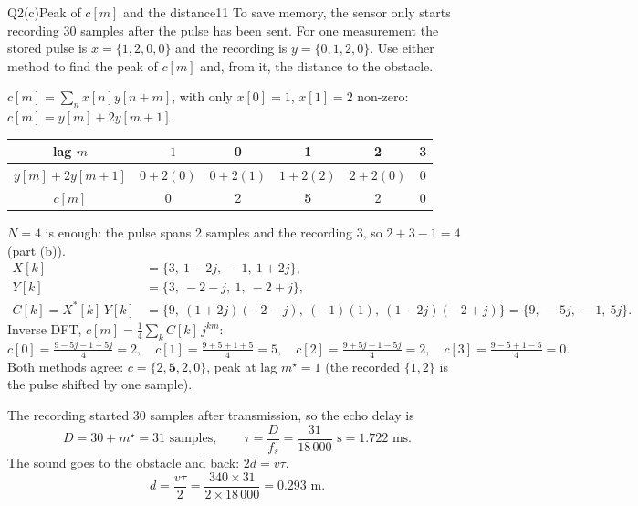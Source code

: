\begin{qcard}{Q2(c)}{Peak of $c[m]$ and the distance}{11}
To save memory, the sensor only starts recording 30 samples after the pulse has been sent. For one measurement the stored pulse is $x=\{1,2,0,0\}$ and the recording is $y=\{0,1,2,0\}$. Use either method to find the peak of $c[m]$ and, from it, the distance to the obstacle.
\end{qcard}
\begin{solution}
 $c[m]=\sum_nx[n]y[n+m]$, with only $x[0]=1$, $x[1]=2$ non-zero: $c[m]=y[m]+2y[m+1]$.
\begin{center}\small\renewcommand{\arraystretch}{1.25}\begin{tabular}{@{}c|ccccc@{}}
lag $m$&$-1$&0&1&2&3\\\hline
$y[m]+2y[m+1]$&$0+2(0)$&$0+2(1)$&$1+2(2)$&$2+2(0)$&$0$\\
$c[m]$&0&2&\textbf{5}&2&0\end{tabular}\end{center}
 $N=4$ is enough: the pulse spans 2 samples and the recording 3, so $2+3-1=4$ (part (b)).
\begin{align*}
X[k]&=\{3,\ 1-2j,\ -1,\ 1+2j\},\\
Y[k]&=\{3,\ -2-j,\ 1,\ -2+j\},\\
C[k]=X^*[k]\,Y[k]&=\{9,\ (1+2j)(-2-j),\ (-1)(1),\ (1-2j)(-2+j)\}=\{9,\ -5j,\ -1,\ 5j\}.
\end{align*}
Inverse DFT, $c[m]=\frac14\sum_kC[k]\,j^{km}$:
\[c[0]=\tfrac{9-5j-1+5j}4=2,\quad c[1]=\tfrac{9+5+1+5}4=5,\quad c[2]=\tfrac{9+5j-1-5j}4=2,\quad c[3]=\tfrac{9-5+1-5}4=0 .\]
Both methods agree: $c=\{2,\mathbf 5,2,0\}$, peak at lag $m^\star=1$ (the recorded $\{1,2\}$ is the pulse shifted by one sample).

\begin{center}
\end{center}

 The recording started 30 samples after transmission, so the echo delay is
\[D=30+m^\star=31\text{ samples},\qquad \tau=\frac{D}{f_s}=\frac{31}{18\,000}\text{ s}=1.722\text{ ms}.\]
 The sound goes to the obstacle and back: $2d=v\tau$.
\[d=\frac{v\tau}{2}=\frac{340\times31}{2\times18\,000}=0.293\text{ m}.\]
\end{solution}

